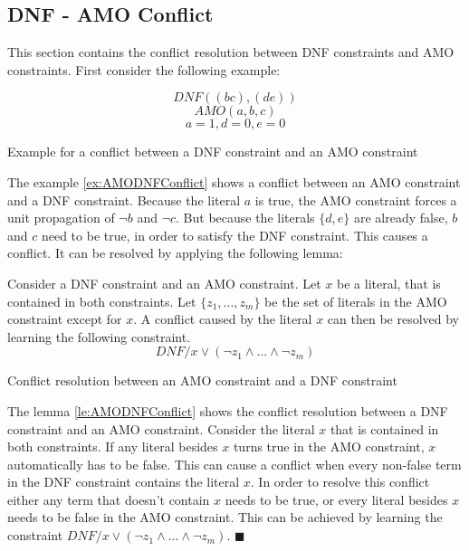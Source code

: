 \subsection{DNF - AMO Conflict}

This section contains the conflict resolution between DNF constraints and AMO constraints. First consider the following example:

\begin{example}
\begin{leftbar}
\begin{displaymath}
DNF((bc),(de))
\end{displaymath}
\begin{displaymath}
AMO(a,b,c)
\end{displaymath}
\begin{displaymath}
a = 1, d = 0, e = 0
\end{displaymath}
\end{leftbar}
\caption{Example for a conflict between a DNF constraint and an AMO constraint}
\label{ex:AMODNFConflict}
\end{example}


The example \ref{ex:AMODNFConflict} shows a conflict between an AMO constraint and a DNF constraint. Because the literal $a$ is true, the AMO constraint forces a unit propagation of $\neg b$ and $\neg c$. But because the literals $\{d,e\}$ are already false, $b$ and $c$ need to be true, in order to satisfy the DNF constraint. This causes a conflict. It can be resolved by applying the following lemma:


\begin{lemma}
\begin{leftbar}
Consider a DNF constraint and an AMO constraint. Let $x$ be a literal, that is contained in both constraints. Let $\{z_1,...,z_m\}$ be the set of literals in the AMO constraint except for $x$. A conflict caused by the literal $x$ can then be resolved by learning the following constraint.
\begin{displaymath}
DNF / x \vee (\neg z_1 \wedge ... \wedge \neg z_m)
\end{displaymath}
\end{leftbar}
\caption{Conflict resolution between an AMO constraint and a DNF constraint}
\label{le:AMODNFConflict}
\end{lemma}

The lemma \ref{le:AMODNFConflict} shows the conflict resolution between a DNF constraint and an AMO constraint. Consider the literal $x$ that is contained in both constraints. If any literal besides $x$ turns true in the AMO constraint, $x$ automatically has to be false. This can cause a conflict when every non-false term in the DNF constraint contains the literal $x$. In order to resolve this conflict either any term that doesn't contain $x$ needs to be true, or every literal besides $x$ needs to be false in the AMO constraint. This can be achieved by learning the constraint $DNF / x \vee (\neg z_1 \wedge ... \wedge \neg z_m)$. $\blacksquare$


